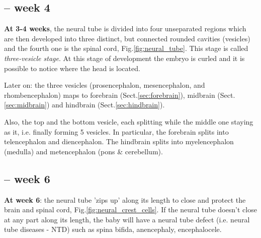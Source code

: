 \subsection{-- week 4}

{\bf At 3-4 weeks}, the neural tube is divided into four unseparated regions
which are then developed into three distinct, but connected rounded cavities
(vesicles) and the fourth one is the spinal cord, Fig.\ref{fig:neural_tube}. 
This stage is called {\it three-vesicle stage}.
At this stage of development the embryo is curled and it is possible to notice
where the head is located.

\begin{mdframed}

Later on: the three vesicles (prosencephalon, mesencephalon, and
rhombencephalon) maps to forebrain (Sect.\ref{sec:forebrain}), midbrain
(Sect.\ref{sec:midbrain}) and hindbrain (Sect.\ref{sec:hindbrain}).

Also, the top and the bottom vesicle, each splitting while the middle one
staying as it, i.e. finally forming 5 vesicles. In particular, the forebrain
splits into telencephalon and diencephalon. The hindbrain splits into myelencephalon
(medulla) and metencephalon (pons \& cerebellum).
\end{mdframed}

\subsection{-- week 6}

{\bf At week 6}: the neural tube 'zips up' along its length to close and protect
the brain and spinal cord, Fig.\ref{fig:neural_crest_cells}. If the neural tube
doesn't close at any part along its length, the baby will  have a neural tube
defect (i.e. neural tube diseases - NTD) such as spina bifida, anencephaly,
encephalocele.



